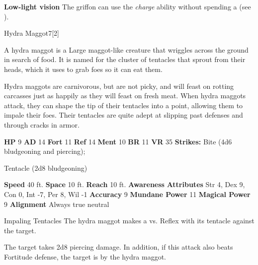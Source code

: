       
      \par\noindent\textbf{Low-light vision}
      The griffon can use the \textit{charge} ability without spending a  (see ).
  
  \begin{monsection}{Hydra Maggot}{7}[2]
    \vspace{-1em}\vspace{-1em}
    \vspace{0em}

    
        A hydra maggot is a Large maggot-like creature that wriggles across the ground in search of food.
        It is named for the cluster of tentacles that sprout from their heads, which it uses to grab foes so it can eat them.
      
        Hydra maggots are carnivorous, but are not picky, and will feast on rotting carcasses just as happily as they will feast on fresh meat.
        When hydra maggots attack, they can shape the tip of their tentacles into a point, allowing them to impale their foes.
        Their tentacles are quite adept at slipping past defenses and through cracks in armor.
      

    \begin{spellcontent}
      \begin{spelltargetinginfo}
        \pari \textbf{HP} 9 \monsep
          \textbf{AD} 14 \monsep
          \textbf{Fort} 11 \monsep
          \textbf{Ref} 14 \monsep
          \textbf{Ment} 10
        \pari \textbf{BR} 11 \monsep
        \textbf{VR} 35
        \pari \textbf{Strikes:}
            Bite  (4d6 bludgeoning and piercing);
\par Tentacle  (2d8 bludgeoning)
      \end{spelltargetinginfo}
    \end{spellcontent}
    \begin{monsterfooter}
      \pari \textbf{Speed} 40 ft. \monsep
        \textbf{Space} 10 ft. \monsep
        \textbf{Reach} 10 ft.
      \pari \textbf{Awareness} 
      \pari \textbf{Attributes}
        Str 4, Dex 9,
        Con 0, Int -7,
        Per 8, Wil -1
      \pari \textbf{Accuracy} 9 \monsep
        \textbf{Mundane Power} 11 \monsep
      \textbf{Magical Power} 9
      \pari \textbf{Alignment} Always true neutral
    \end{monsterfooter}
  \end{monsection}
  \begin{freeability}{Impaling Tentacles}
       The hydra maggot makes a 
         vs. Reflex
        with its tentacle against the target.
    
    \hit 
          The target takes 2d8 piercing damage.
          In addition, if this attack also beats Fortitude defense, the target is  by the hydra maggot.
    \end{freeability}
  
